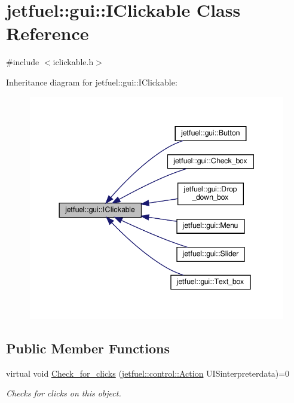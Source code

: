 \hypertarget{classjetfuel_1_1gui_1_1IClickable}{}\section{jetfuel\+:\+:gui\+:\+:I\+Clickable Class Reference}
\label{classjetfuel_1_1gui_1_1IClickable}


{\ttfamily \#include $<$iclickable.\+h$>$}



Inheritance diagram for jetfuel\+:\+:gui\+:\+:I\+Clickable\+:
\nopagebreak
\begin{figure}[H]
\begin{center}
\leavevmode
\includegraphics[width=344pt]{classjetfuel_1_1gui_1_1IClickable__inherit__graph}
\end{center}
\end{figure}
\subsection*{Public Member Functions}
\begin{DoxyCompactItemize}
\item 
virtual void \hyperlink{classjetfuel_1_1gui_1_1IClickable_aea45de37bd3beb7eb7e2e3056e4e37b3}{Check\+\_\+for\+\_\+clicks} (\hyperlink{structjetfuel_1_1control_1_1Action}{jetfuel\+::control\+::\+Action} U\+I\+Sinterpreterdata)=0
\begin{DoxyCompactList}\small\item\em Checks for clicks on this object. \end{DoxyCompactList}\end{DoxyCompactItemize}


